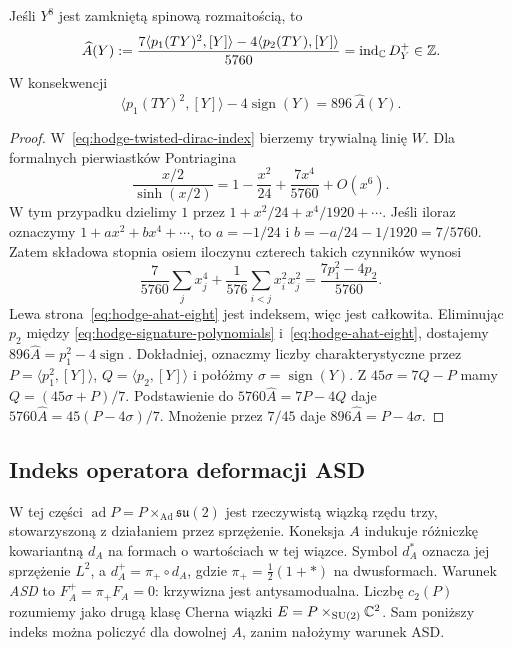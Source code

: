 \begin{twierdzenie}
\label{thm:hodge-dirac-eight}
Jeśli \(Y^8\) jest zamkniętą spinową
rozmaitością, to
\begin{equation}\label{eq:hodge-ahat-eight}
 \widehat A(Y):=
 \frac{7\langle p_1(TY)^2,[Y]\rangle
       -4\langle p_2(TY),[Y]\rangle}{5760}
 =\operatorname{ind}_{\mathbb{C}}D^+_Y\in\mathbb{Z}.
\end{equation}
W konsekwencji
\begin{equation}\label{eq:hodge-896}
 \langle p_1(TY)^2,[Y]\rangle
      -4\operatorname{sign}(Y)
 =896\,\widehat A(Y).
\end{equation}
\end{twierdzenie}
\begin{proof}
W~\eqref{eq:hodge-twisted-dirac-index}
bierzemy trywialną linię \(W\). Dla
formalnych pierwiastków Pontriagina
\[
 \frac{x/2}{\sinh(x/2)}
 =1-\frac{x^2}{24}+\frac{7x^4}{5760}
  +O(x^6).
\]
W tym przypadku dzielimy $1$ przez
$1+x^2/24+x^4/1920+\cdots$.
Jeśli iloraz oznaczymy $1+ax^2+bx^4+\cdots$, to
$a=-1/24$ i $b=-a/24-1/1920=7/5760$.
Zatem składowa stopnia osiem iloczynu
czterech takich czynników wynosi
\[
 \frac7{5760}\sum_jx_j^4
 +\frac1{576}\sum_{i<j}x_i^2x_j^2
 =\frac{7p_1^2-4p_2}{5760}.
\]
Lewa strona~\eqref{eq:hodge-ahat-eight}
jest indeksem, więc jest całkowita.
Eliminując \(p_2\) między
\eqref{eq:hodge-signature-polynomials}
i~\eqref{eq:hodge-ahat-eight}, dostajemy
\(896\widehat A=p_1^2-4\operatorname{sign}\).
Dokładniej, oznaczmy liczby charakterystyczne przez
$P=\langle p_1^2,[Y]\rangle$, $Q=\langle p_2,[Y]\rangle$
i połóżmy $\sigma=\operatorname{sign}(Y)$.
Z $45\sigma=7Q-P$ mamy $Q=(45\sigma+P)/7$.
Podstawienie do $5760\widehat A=7P-4Q$ daje
$5760\widehat A=45(P-4\sigma)/7$.
Mnożenie przez $7/45$ daje $896\widehat A=P-4\sigma$.
\end{proof}

\subsection*{Indeks operatora deformacji ASD}

W tej części $\operatorname{ad}P=P\times_{\operatorname{Ad}}\mathfrak{su}(2)$
jest rzeczywistą wiązką rzędu trzy, stowarzyszoną
z działaniem przez sprzężenie.
Koneksja $A$ indukuje różniczkę kowariantną $d_A$
na formach o wartościach w tej wiązce.
Symbol $d_A^*$ oznacza jej sprzężenie $L^2$, a
$d_A^+=\pi_+\circ d_A$, gdzie $\pi_+=\frac12(1+*)$ na dwusformach.
Warunek \emph{ASD} to $F_A^+=\pi_+F_A=0$:
krzywizna jest antysamodualna.
Liczbę $c_2(P)$ rozumiemy jako drugą klasę Cherna
wiązki $E=P\times_{\mathrm{SU}(2)}\mathbb{C}^2$.
Sam poniższy indeks można policzyć dla dowolnej $A$,
zanim nałożymy warunek ASD.

